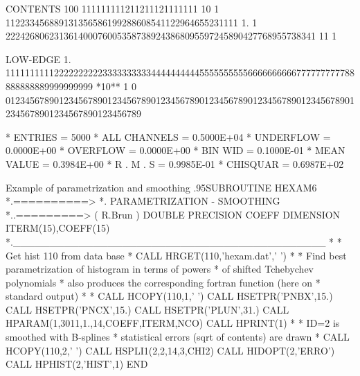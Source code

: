 \begin{Listing}
 CONTENTS 100                               111111111211211121111111                                                
           10                 1 112233456889131356586199288608541122964655231111                                    
            1.    1    2224268062313614000760053587389243868095597245890427768955738341  11        1                
 
 LOW-EDGE   1.            111111111122222222223333333333444444444455555555556666666666777777777788888888889999999999
 *10**  1   0   0123456789012345678901234567890123456789012345678901234567890123456789012345678901234567890123456789
 
 * ENTRIES =       5000      * ALL CHANNELS = 0.5000E+04      * UNDERFLOW = 0.0000E+00      * OVERFLOW = 0.0000E+00
 * BIN WID = 0.1000E-01      * MEAN VALUE   = 0.3984E+00      * R . M . S = 0.9985E-01
 * CHISQUAR  =  0.6987E+02
\end{Listing}
\finalnewpage
\begin{XMPt}{Example of parametrization and smoothing}
\baselineskip.95\baselineskip\relax      SUBROUTINE HEXAM6
*.==========>
*.           PARAMETRIZATION      -     SMOOTHING
*..=========> ( R.Brun )
      DOUBLE PRECISION COEFF
      DIMENSION ITERM(15),COEFF(15)
*.___________________________________________
*
*             Get hist 110 from data base
*
      CALL HRGET(110,'hexam.dat',' ')
*
*       Find best parametrization of histogram in terms of powers
*       of shifted Tchebychev polynomials
*       also produces the corresponding fortran function (here on
*       standard output)
*
*
      CALL HCOPY(110,1,' ')
      CALL HSETPR('PNBX',15.)
      CALL HSETPR('PNCX',15.)
      CALL HSETPR('PLUN',31.)
      CALL HPARAM(1,3011,1.,14,COEFF,ITERM,NCO)
      CALL HPRINT(1)
*
*        ID=2 is smoothed with B-splines
*        statistical errors (sqrt of contents) are drawn
*
      CALL HCOPY(110,2,' ')
      CALL HSPLI1(2,2,14,3,CHI2)
      CALL HIDOPT(2,'ERRO')
      CALL HPHIST(2,'HIST',1)
      END
\end{XMPt}
\finalnewpage
